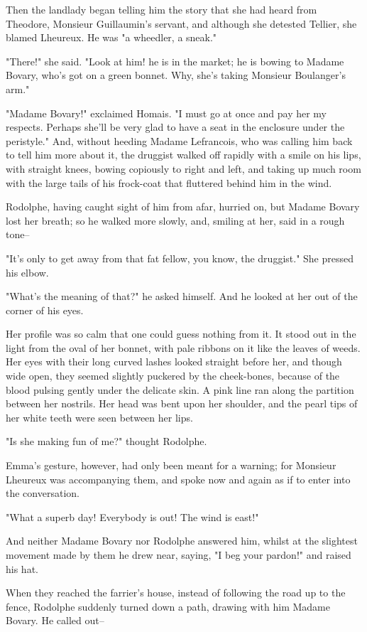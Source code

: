 \documentclass{tufte-book}
\begin{document}
Then the landlady began telling him the story that she had heard from
Theodore, Monsieur Guillaumin's servant, and although she detested
Tellier, she blamed Lheureux. He was "a wheedler, a sneak."

"There!" she said. "Look at him! he is in the market; he is bowing to
Madame Bovary, who's got on a green bonnet. Why, she's taking Monsieur
Boulanger's arm."

"Madame Bovary!" exclaimed Homais. "I must go at once and pay her my
respects. Perhaps she'll be very glad to have a seat in the enclosure
under the peristyle." And, without heeding Madame Lefrancois, who was
calling him back to tell him more about it, the druggist walked off
rapidly with a smile on his lips, with straight knees, bowing copiously
to right and left, and taking up much room with the large tails of his
frock-coat that fluttered behind him in the wind.

Rodolphe, having caught sight of him from afar, hurried on, but Madame
Bovary lost her breath; so he walked more slowly, and, smiling at her,
said in a rough tone--

"It's only to get away from that fat fellow, you know, the druggist."
She pressed his elbow.

"What's the meaning of that?" he asked himself. And he looked at her out
of the corner of his eyes.

Her profile was so calm that one could guess nothing from it. It stood
out in the light from the oval of her bonnet, with pale ribbons on it
like the leaves of weeds. Her eyes with their long curved lashes looked
straight before her, and though wide open, they seemed slightly puckered
by the cheek-bones, because of the blood pulsing gently under the
delicate skin. A pink line ran along the partition between her nostrils.
Her head was bent upon her shoulder, and the pearl tips of her white
teeth were seen between her lips.

"Is she making fun of me?" thought Rodolphe.

Emma's gesture, however, had only been meant for a warning; for Monsieur
Lheureux was accompanying them, and spoke now and again as if to enter
into the conversation.

"What a superb day! Everybody is out! The wind is east!"

And neither Madame Bovary nor Rodolphe answered him, whilst at the
slightest movement made by them he drew near, saying, "I beg your
pardon!" and raised his hat.

When they reached the farrier's house, instead of following the road
up to the fence, Rodolphe suddenly turned down a path, drawing with him
Madame Bovary. He called out--
\end{document}
